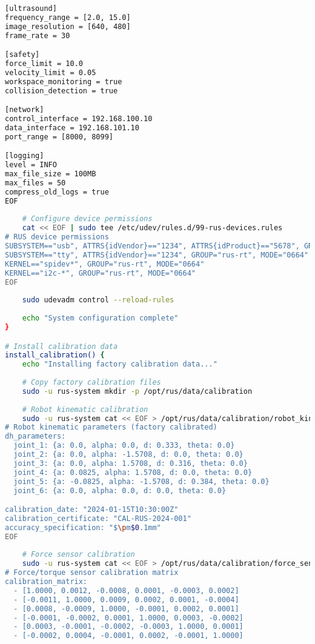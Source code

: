 \begin{lstlisting}[language=bash, caption={RUS Software Installation Script}, label={lst:app-software-install}]
[ultrasound]
frequency_range = [2.0, 15.0]
image_resolution = [640, 480]
frame_rate = 30

[safety]
force_limit = 10.0
velocity_limit = 0.05
workspace_monitoring = true
collision_detection = true

[network]
control_interface = 192.168.100.10
data_interface = 192.168.101.10
port_range = [8000, 8099]

[logging]
level = INFO
max_file_size = 100MB
max_files = 50
compress_old_logs = true
EOF
    
    # Configure device permissions
    cat << EOF | sudo tee /etc/udev/rules.d/99-rus-devices.rules
# RUS device permissions
SUBSYSTEM=="usb", ATTRS{idVendor}=="1234", ATTRS{idProduct}=="5678", GROUP="rus-rt", MODE="0664"
SUBSYSTEM=="tty", ATTRS{idVendor}=="1234", GROUP="rus-rt", MODE="0664"
KERNEL=="spidev*", GROUP="rus-rt", MODE="0664"
KERNEL=="i2c-*", GROUP="rus-rt", MODE="0664"
EOF
    
    sudo udevadm control --reload-rules
    
    echo "System configuration complete"
}

# Install calibration data
install_calibration() {
    echo "Installing factory calibration data..."
    
    # Copy factory calibration files
    sudo -u rus-system mkdir -p /opt/rus/data/calibration
    
    # Robot kinematic calibration
    sudo -u rus-system cat << EOF > /opt/rus/data/calibration/robot_kinematics.yaml
# Robot kinematic parameters (factory calibrated)
dh_parameters:
  joint_1: {a: 0.0, alpha: 0.0, d: 0.333, theta: 0.0}
  joint_2: {a: 0.0, alpha: -1.5708, d: 0.0, theta: 0.0}
  joint_3: {a: 0.0, alpha: 1.5708, d: 0.316, theta: 0.0}
  joint_4: {a: 0.0825, alpha: 1.5708, d: 0.0, theta: 0.0}
  joint_5: {a: -0.0825, alpha: -1.5708, d: 0.384, theta: 0.0}
  joint_6: {a: 0.0, alpha: 0.0, d: 0.0, theta: 0.0}

calibration_date: "2024-01-15T10:30:00Z"
calibration_certificate: "CAL-RUS-2024-001"
accuracy_specification: "$\pm$0.1mm"
EOF
    
    # Force sensor calibration
    sudo -u rus-system cat << EOF > /opt/rus/data/calibration/force_sensor.yaml
# Force/torque sensor calibration matrix
calibration_matrix:
  - [1.0000, 0.0012, -0.0008, 0.0001, -0.0003, 0.0002]
  - [-0.0011, 1.0000, 0.0009, 0.0002, 0.0001, -0.0004]
  - [0.0008, -0.0009, 1.0000, -0.0001, 0.0002, 0.0001]
  - [-0.0001, -0.0002, 0.0001, 1.0000, 0.0003, -0.0002]
  - [0.0003, -0.0001, -0.0002, -0.0003, 1.0000, 0.0001]
  - [-0.0002, 0.0004, -0.0001, 0.0002, -0.0001, 1.0000]


\end{lstlisting}
